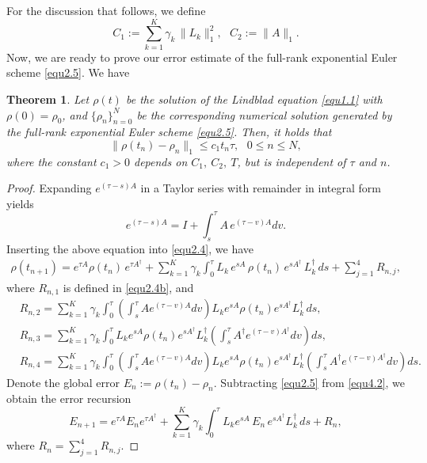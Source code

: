 \documentclass[preprint,3p,compress,12pt]{elsarticle}
\numberwithin{equation}{section}
\newtheorem{theorem}{Theorem}[section]
\numberwithin{figure}{section}
\begin{document}
For the discussion that follows, we define
\[C_1:=\sum_{k=1}^K\gamma_k \, \|L_k\|_1^2,~~~C_2:=\|A\|_1.\]
Now, we are ready to prove our error estimate of the full-rank exponential Euler scheme \eqref{equ2.5}. We have
\begin{theorem}\label{thm4.1}
  Let $\rho(t)$ be the solution of the Lindblad equation \eqref{equ1.1} with
  $\rho(0)=\rho_0$, and $\{\rho_n\}_{n=0}^N$ be the corresponding numerical solution generated by the full-rank exponential Euler scheme \eqref{equ2.5}. Then, it holds that
  \[\|\rho(t_n)-\rho_n\|_1\leq c_1t_n\tau,~~~0\leq n\leq N,\]
  where the constant $c_1>0$ depends on $C_1,~C_2,~T$, but is independent of $\tau$ and $n$.
\end{theorem}
\begin{proof}
Expanding $e^{(\tau-s)A}$ in a Taylor series with remainder in integral form yields
\begin{equation*}
  e^{(\tau-s)A}=I+\int_{s}^{\tau}A \, e^{(\tau-v)A}dv.
\end{equation*}
Inserting the above equation into \eqref{equ2.4}, we have
\begin{eqnarray}\label{equ4.2}
  \rho(t_{n+1})=e^{\tau A}\rho(t_n) \, e^{\tau A^{\dag}}+\sum_{k=1}^K\gamma_k
  \int_0^{\tau}L_k \, e^{sA} \, \rho(t_n) \, e^{sA^{\dag}} \, L_k^{\dag} \, ds+\sum_{j=1}^4R_{n,j},
\end{eqnarray}
where $R_{n,1}$ is defined in \eqref{equ2.4b}, and
  \begin{align*}
  &R_{n,2}=\sum_{k=1}^K\gamma_k
  \int_0^{\tau}\left(\int_s^{\tau}Ae^{(\tau-v)A}dv\right)L_ke^{sA}\rho(t_n)e^{sA^{\dag}} L_k^{\dag} \, ds,\\
  &R_{n,3}=\sum_{k=1}^K\gamma_k
  \int_0^{\tau}L_ke^{sA}\rho(t_n)e^{sA^{\dag}} L_k^{\dag}\left(\int_s^{\tau}A^{\dag}e^{(\tau-v)A^{\dag}}dv\right)ds,\\
  &R_{n,4}=\sum_{k=1}^K\gamma_k
  \int_0^{\tau}\left(\int_s^{\tau}Ae^{(\tau-v)A}dv\right)L_ke^{sA}\rho(t_n)e^{sA^{\dag}} L_k^{\dag}\left(\int_s^{\tau}A^{\dag}e^{(\tau-v)A^{\dag}}dv\right)ds.
\end{align*}
Denote the global error $E_n:=\rho(t_n)-\rho_n$. Subtracting \eqref{equ2.5} from \eqref{equ4.2}, we obtain the error recursion
\begin{equation}\label{equ4.3}
  E_{n+1}=e^{\tau A}E_ne^{\tau A^{\dag}}+\sum_{k=1}^K\gamma_k
  \int_0^{\tau}L_ke^{sA}  \, E_n  \, e^{sA^{\dag}} L_k^{\dag} \, ds+R_n,
\end{equation}
where $R_n=\sum_{j=1}^4R_{n,j}$.


\end{proof}
\end{document}
